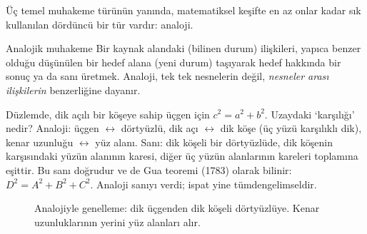 Üç temel muhakeme türünün yanında, matematiksel keşifte en az onlar kadar sık kullanılan dördüncü bir tür vardır: analoji.

\begin{tanim}{Analojik muhakeme}
Bir kaynak alandaki (bilinen durum) ilişkileri, yapıca benzer olduğu düşünülen bir hedef alana (yeni durum) taşıyarak hedef hakkında bir sonuç ya da sanı üretmek. Analoji, tek tek nesnelerin değil, \emph{nesneler arası ilişkilerin} benzerliğine dayanır.
\end{tanim}

\begin{ornek}
Düzlemde, dik açılı bir köşeye sahip üçgen için $c^2=a^2+b^2$. Uzaydaki ‘karşılığı’ nedir? Analoji: üçgen $\leftrightarrow$ dörtyüzlü, dik açı $\leftrightarrow$ dik köşe (üç yüzü karşılıklı dik), kenar uzunluğu $\leftrightarrow$ yüz alanı. Sanı: dik köşeli bir dörtyüzlüde, dik köşenin karşısındaki yüzün alanının karesi, diğer üç yüzün alanlarının kareleri toplamına eşittir. Bu sanı doğrudur ve de Gua teoremi (1783) olarak bilinir: $D^2=A^2+B^2+C^2$. Analoji sanıyı verdi; ispat yine tümdengelimseldir.
\end{ornek}

\begin{figure}[h]
\centering
{}
\caption{Analojiyle genelleme: dik üçgenden dik köşeli dörtyüzlüye. Kenar uzunluklarının yerini yüz alanları alır.}
\end{figure}


